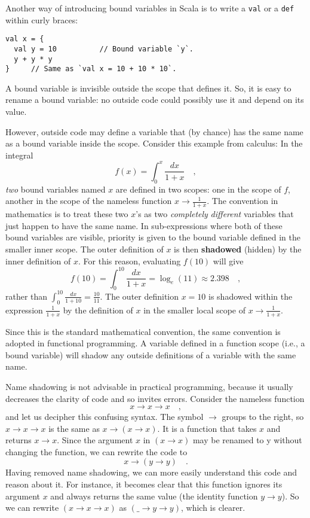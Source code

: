 Another way of introducing bound variables in Scala is to write a
\lstinline!val! or a \lstinline!def! within curly braces:
\begin{lstlisting}
val x = {
  val y = 10          // Bound variable `y`.
  y + y * y
}     // Same as `val x = 10 + 10 * 10`.
\end{lstlisting}

A bound variable is invisible outside the scope that defines it. So,
it is easy to rename a bound variable: no outside code could possibly
use it and depend on its value.

However, outside code may define a variable that (by chance) has the
same name as a bound variable inside the scope. Consider this example
from calculus: In the integral
\[
f(x)=\int_{0}^{x}\frac{dx}{1+x}\quad,
\]
\emph{two} bound variables named $x$ are defined in two scopes: one
in the scope of $f$, another in the scope of the nameless function
$x\rightarrow\frac{1}{1+x}$. The convention in mathematics is to
treat these two $x$\textsf{'}s as two \emph{completely} \emph{different} variables
that just happen to have the same name. In sub-expressions where both
of these bound variables are visible, priority is given to the bound
variable defined in the smaller inner scope. The outer definition
of $x$ is then \textbf{shadowed} (hidden) by
the inner definition of $x$. For this reason, evaluating $f(10)$
will give
\[
f(10)=\int_{0}^{10}\frac{dx}{1+x}=\log_{e}(11)\approx2.398\quad,
\]
rather than $\int_{0}^{10}\frac{dx}{1+10}=\frac{10}{11}$. The outer
definition $x=10$ is shadowed within the expression $\frac{1}{1+x}$
by the definition of $x$ in the smaller local scope of $x\rightarrow\frac{1}{1+x}$.

Since this is the standard mathematical convention, the same convention
is adopted in functional programming. A variable defined in a function
scope (i.e., a bound variable) will shadow any outside definitions
of a variable with the same name.

Name shadowing is not advisable in practical programming, because
it usually decreases the clarity of code and so invites errors. Consider
the nameless function
\[
x\rightarrow x\rightarrow x\quad,
\]
and let us decipher this confusing syntax. The symbol $\rightarrow$
groups to the right, so $x\rightarrow x\rightarrow x$ is the same
as $x\rightarrow\left(x\rightarrow x\right)$. It is a function that
takes $x$ and returns $x\rightarrow x$. Since the argument $x$
in $\left(x\rightarrow x\right)$ may be renamed to y without changing
the function, we can rewrite the code to
\[
x\rightarrow\left(y\rightarrow y\right)\quad.
\]
Having removed name shadowing, we can more easily understand this
code and reason about it. For instance, it becomes clear that this
function ignores its argument $x$ and always returns the same value
(the identity function $y\rightarrow y$). So we can rewrite $\left(x\rightarrow x\rightarrow x\right)$
as $\left(\_\rightarrow y\rightarrow y\right)$, which is clearer.

